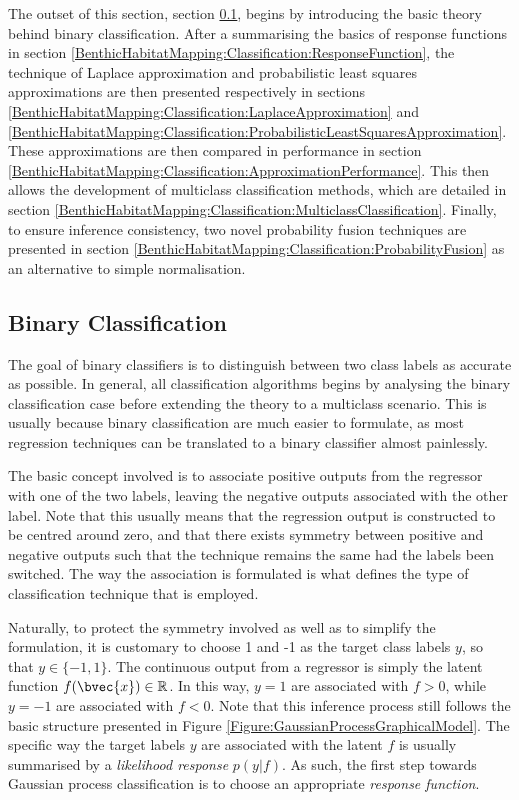 		The outset of this section, section \ref{BenthicHabitatMapping:Classification:BinaryClassification}, begins by introducing the basic theory behind binary classification. After a summarising the basics of response functions in section \ref{BenthicHabitatMapping:Classification:ResponseFunction}, the technique of Laplace approximation and probabilistic least squares approximations are then presented respectively in sections \ref{BenthicHabitatMapping:Classification:LaplaceApproximation} and \ref{BenthicHabitatMapping:Classification:ProbabilisticLeastSquaresApproximation}. These approximations are then compared in performance in section \ref{BenthicHabitatMapping:Classification:ApproximationPerformance}. This then allows the development of multiclass classification methods, which are detailed in section \ref{BenthicHabitatMapping:Classification:MulticlassClassification}. Finally, to ensure inference consistency, two novel probability fusion techniques are presented in section \ref{BenthicHabitatMapping:Classification:ProbabilityFusion} as an alternative to simple normalisation.
		
		\subsection{Binary Classification}
		\label{BenthicHabitatMapping:Classification:BinaryClassification}
			
			The goal of binary classifiers is to distinguish between two class labels as accurate as possible. In general, all classification algorithms begins by analysing the binary classification case before extending the theory to a multiclass scenario. This is usually because binary classification are much easier to formulate, as most regression techniques can be translated to a binary classifier almost painlessly.
			
			The basic concept involved is to associate positive outputs from the regressor with one of the two labels, leaving the negative outputs associated with the other label. Note that this usually means that the regression output is constructed to be centred around zero, and that there exists symmetry between positive and negative outputs such that the technique remains the same had the labels been switched. The way the association is formulated is what defines the type of classification technique that is employed.
			
			Naturally, to protect the symmetry involved as well as to simplify the formulation, it is customary to choose 1 and -1 as the target class labels $y$, so that $y \in \{-1, 1\}$. The continuous output from a regressor is simply the latent function $f(\bvec{x}) \in \mathbb{R}$. In this way, $y = 1$ are associated with $f > 0$, while $y = -1$ are associated with $f < 0$. Note that this inference process still follows the basic structure presented in Figure \ref{Figure:GaussianProcessGraphicalModel}. The specific way the target labels $y$ are associated with the latent $f$ is usually summarised by a \textit{likelihood response} $p(y | f)$. As such, the first step towards Gaussian process classification is to choose an appropriate \textit{response function}.
			

